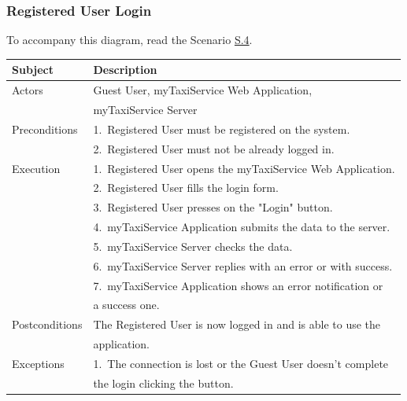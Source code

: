 \subsubsection{Registered User Login}
			To accompany this diagram, read the Scenario \hyperref[sec:RegisteredUserLoginScenario]{S.4}.

				\begin{table}[htpb]
					\centering
					\label{tab:RegisteredUserLoginDiagramTable}
					\begin{tabularx}{\textwidth}{lp{9cm}}
						\hline
						\hline
							\textbf{Subject}
						& 
							\textbf{Description}\\
						\hline
							Actors	       &  Guest User, myTaxiService Web Application, \\
										   &  myTaxiService Server\\
						\hline
							Preconditions  &  1.~Registered User must be registered on the system.\\
							               &  2.~Registered User must not be already logged in.\\
						\hline
							Execution      &  1.~Registered User opens the myTaxiService Web Application.\\
										   &  2.~Registered User fills the login form.\\
										   &  3.~Registered User presses on the "Login" button.\\
										   &  4.~myTaxiService Application submits the data to the server.\\
										   &  5.~myTaxiService Server checks the data.\\
										   &  6.~myTaxiService Server replies with an error or with success.\\
										   &  7.~myTaxiService Application shows an error notification or\\
										   &     a success one.\\
						\hline
							Postconditions &  The Registered User is now logged in and is able to use the\\
							               &  application.\\
						\hline
							Exceptions     &  1.~The connection is lost or the Guest User doesn't complete\\ 
										   &     the login clicking the button.\\
									
						\hline
						\hline
					\end{tabularx}
				\end{table}

